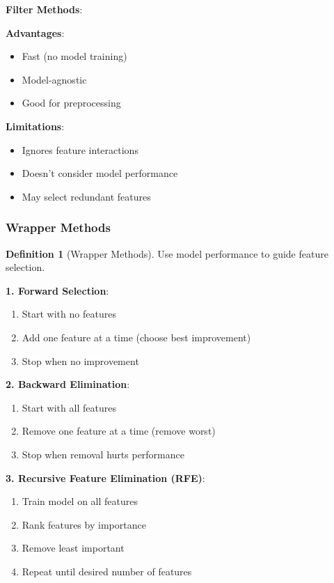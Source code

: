 \documentclass[11pt,twoside]{article}
\numberwithin{equation}{section}
\theoremstyle{plain}
\theoremstyle{definition}
\newtheorem{definition}[theorem]{Definition}
\theoremstyle{remark}
\newenvironment{keyidea}{
  \begin{tcolorbox}[colback=yellow!5!white,
                    colframe=yellow!50!black,
                    title=Key Idea,
                    breakable,
                    enhanced,
                    sharp corners,
                    boxrule=0.8pt,
                    left=6pt, right=6pt, top=6pt, bottom=6pt]
}{
  \end{tcolorbox}
}
\begin{document}
\begin{keyidea}
\textbf{Filter Methods}:

\textbf{Advantages}:
\begin{itemize}
\item Fast (no model training)
\item Model-agnostic
\item Good for preprocessing
\end{itemize}

\textbf{Limitations}:
\begin{itemize}
\item Ignores feature interactions
\item Doesn't consider model performance
\item May select redundant features
\end{itemize}
\end{keyidea}

\subsubsection{Wrapper Methods}

\begin{definition}[Wrapper Methods]
Use model performance to guide feature selection.

\textbf{1. Forward Selection}:
\begin{enumerate}
\item Start with no features
\item Add one feature at a time (choose best improvement)
\item Stop when no improvement
\end{enumerate}

\textbf{2. Backward Elimination}:
\begin{enumerate}
\item Start with all features
\item Remove one feature at a time (remove worst)
\item Stop when removal hurts performance
\end{enumerate}

\textbf{3. Recursive Feature Elimination (RFE)}:
\begin{enumerate}
\item Train model on all features
\item Rank features by importance
\item Remove least important
\item Repeat until desired number of features
\end{enumerate}
\end{definition}
\end{document}
